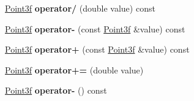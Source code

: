 \begin{DoxyCompactItemize}
\mbox{\hyperlink{struct_point3f}{Point3f}} {\bfseries operator/} (double value) const
\item 
\mbox{\label{struct_point3f_a14b63b81244e7b7e1b71b68a927a8770}} 
\mbox{\hyperlink{struct_point3f}{Point3f}} {\bfseries operator-\/} (const \mbox{\hyperlink{struct_point3f}{Point3f}} \&value) const
\item 
\mbox{\label{struct_point3f_ab51a7ed83409b4608465b0ad2c73e30e}} 
\mbox{\hyperlink{struct_point3f}{Point3f}} {\bfseries operator+} (const \mbox{\hyperlink{struct_point3f}{Point3f}} \&value) const
\item 
\mbox{\label{struct_point3f_ac77dc02dc54a17dc5fa496c2013c677a}} 
\mbox{\hyperlink{struct_point3f}{Point3f}} {\bfseries operator+=} (double value)
\item 
\mbox{\label{struct_point3f_a134dba0411bda961caf71a80690cf88e}} 
\mbox{\hyperlink{struct_point3f}{Point3f}} {\bfseries operator-\/} () const
\end{DoxyCompactItemize}
